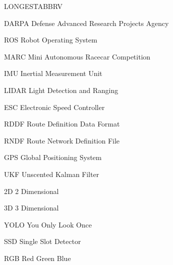 \begin{theglossary}{LONGESTABBRV}

\item[DARPA] Defense Advanced Research Projects Agency
\item[ROS] Robot Operating System
\item[MARC] Mini Autonomous Racecar Competition
\item[IMU] Inertial Measurement Unit
\item[LIDAR] Light Detection and Ranging
\item[ESC] Electronic Speed Controller
\item[RDDF] Route Definition Data Format
\item[RNDF] Route Network Definition File
\item[GPS] Global Positioning System
\item[UKF] Unscented Kalman Filter
\item[2D] 2 Dimensional
\item[3D] 3 Dimensional
\item[YOLO] You Only Look Once
\item[SSD] Single Slot Detector
\item[RGB] Red Green Blue

\end{theglossary}

